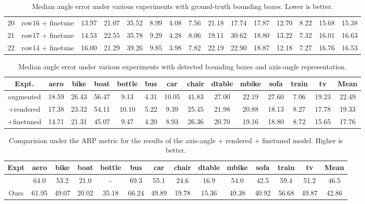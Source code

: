 \documentclass[10pt,twocolumn,letterpaper]{article}
\begin{document}
\begin{table*}[h!]
\begin{tabular}{|c|@{\;}c@{\;}|cccccccccccc|c|}
		20 & row16 + finetune & 13.97 & 21.07 & 35.52 & 8.99 & 4.08 & 7.56 & 21.18 & 17.74 & 17.87 & 12.70 & 8.22 & 15.68 & 15.38 \\ 
		21 & row17 + finetune & 14.53 & 22.55 & 35.78 & 9.29 & 4.28 & 8.06 & 19.11 & 30.62 & 18.80 & 13.22 & 7.32 & 16.01 & 16.63 \\ 
		22 & row14 + finetune & 16.00 & 21.29 & 39.26 & 9.85 & 3.98 & 7.82 & 22.19 & 22.90 & 18.87 & 12.18 & 7.27 & 16.76 & 16.53 \\ 
		\hline
	\end{tabular}
	\caption{Median angle error under various experiments with ground-truth bounding boxes. Lower is better.}
	\label{table:all_results}
\end{table*}\begin{table*}[h!]
	\small
	\centering
	\begin{tabular}{|c|cccccccccccc|c|}
	\hline
	Expt. & aero & bike & boat & bottle & bus & car & chair & dtable & mbike & sofa	& train 
	& tv & Mean \\
	\hline
	augmented & 18.59 & 26.43 & 56.47 & 9.13 & 4.31 & 10.05 & 41.83 & 27.00 & 22.19 & 27.60 & 
	7.06 & 19.23 & 22.49 \\ 
	+rendered & 17.38 & 23.32 & 54.11 & 10.10 & 5.22 & 9.39 & 25.45 & 21.98 & 20.88 & 18.13 & 
	8.27 & 17.78 & 19.33 \\ 
	+finetuned & 14.71 & 21.31 & 45.07 & 9.47 & 4.20 & 8.93 & 26.36 & 20.70 & 19.16 & 18.80 & 
	8.72 & 15.65 & 17.76 \\ 
	\hline
	\end{tabular}
\caption{Median angle error under various experiments with detected bounding boxes and 
axis-angle representation.}
\label{table:det_results}
\end{table*}\begin{table*}[h!]
	\small
	\centering
	\begin{tabular}{|c|cccccccccccc|c|}
	\hline
	Expt & aero & bike & boat & bottle & bus & car &chair & dtable & mbike & sofa & train & tv & Mean \\
	\hline
	\cite{Tulsiani:CVPR15} & 64.0 & 53.2 & 21.0 & - & 69.3 & 55.1 & 24.6 & 16.9 & 54.0 & 42.5 & 59.4 & 51.2 & 46.5 \\
	Ours & 61.95 & 49.07 & 20.02 & 35.18 & 66.24 & 49.89 & 19.78 & 15.36 & 49.38 & 40.92 & 56.68 & 49.87 & 42.86 \\ 
	\hline
	\end{tabular}
	\caption{Comparision under the ARP metric for the results of the axis-angle + rendered + finetuned model. Higher is better.}

\end{table*}
\end{document}
